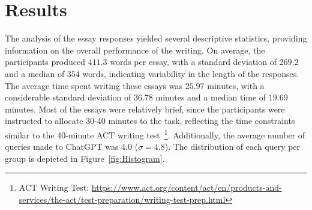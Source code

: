 \documentclass[manuscript,screen,acmsmall]{acmart}
\begin{document}
\section{Results}
    The analysis of the essay responses yielded several descriptive statistics, providing information on the overall performance of the writing. On average, the participants produced $411.3$ words per essay, with a standard deviation of $269.2$ and a median of $354$ words, indicating variability in the length of the responses. The average time spent writing these essays was $25.97$ minutes, with a considerable standard deviation of $36.78$ minutes and a median time of $19.69$ minutes. Most of the essays were relatively brief, since the participants were instructed to allocate 30-40 minutes to the task, reflecting the time constraints similar to the 40-minute ACT writing test~\footnote{ACT Writing Test: \url{https://www.act.org/content/act/en/products-and-services/the-act/test-preparation/writing-test-prep.html}}.
    Additionally, the average number of queries made to ChatGPT was 4.0 ($\sigma=4.8$). The distribution of each query per group is depicted in Figure~\ref{fig:Histogram}.
\end{document}
